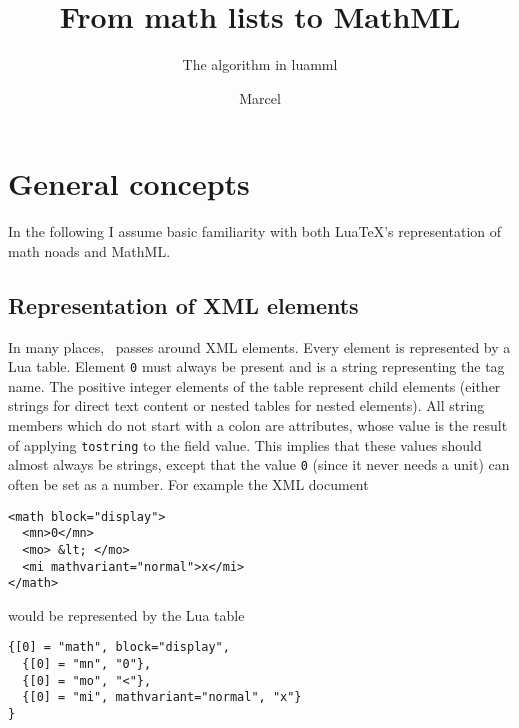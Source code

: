 \documentclass{article}
\begin{document}
\title{From math lists to MathML}
\subtitle{The algorithm in luamml}
\author{Marcel}
\maketitle
\section{General concepts}
In the following I assume basic familiarity with both Lua\TeX's representation of math noads and MathML.

\subsection{Representation of XML elements}
In many places, \luamml\ passes around XML elements. Every element is represented by a Lua table.
Element \texttt 0 must always be present and is a string representing the tag name.
The positive integer elements of the table represent child elements (either strings for direct text content or nested tables for nested elements).
All string members which do not start with a colon are attributes, whose value is the result of applying \texttt{tostring} to the field value.
This implies that these values should almost always be strings, except that the value \texttt 0 (since it never needs a unit) can often be set as a number.
For example the XML document
\begin{verbatim}
<math block="display">
  <mn>0</mn>
  <mo> &lt; </mo>
  <mi mathvariant="normal">x</mi>
</math>
\end{verbatim}
would be represented by the Lua table
\begin{verbatim}
{[0] = "math", block="display",
  {[0] = "mn", "0"},
  {[0] = "mo", "<"},
  {[0] = "mi", mathvariant="normal", "x"}
}
\end{verbatim}
\end{document}
